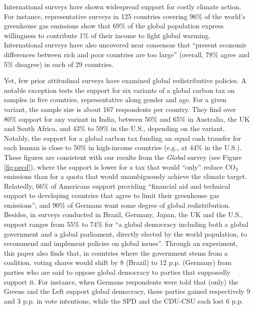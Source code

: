 International surveys have shown widespread support for costly climate action.\citep{dechezlepretre_fighting_2022,leiserowitz_international_2022} For instance, representative surveys in 125 countries covering 96\% of the world's greenhouse gas emissions show that 69\% of the global population express willingness to contribute 1\% of their income to fight global warming.\cite{andre_globally_2024} International surveys have also uncovered near consensus that ``present economic differences between rich and poor countries are too large'' (overall, 78\% agree and 5\% disagree) in each of 29 countries.\citep{issp_international_2019} 

Yet, few prior attitudinal surveys have examined global redistributive policies. 
A notable exception tests the support for six variants of a global carbon tax on samples in five countries, representative along gender and age.\cite{carattini_how_2019} For a given variant, the sample size is about 167 respondents per country. They find over 80\% support for any variant in India, between 50\% and 65\% in Australia, the UK and South Africa, and 43\% to 59\% in the U.S., depending on the variant. Notably, the support for a global carbon tax funding an equal cash transfer for each human is close to 50\% in high-income countries (e.g., at 44\% in the U.S.). These figures are consistent with our results from the \textit{Global} survey (see Figure \ref{fig:oecd}), where the support is lower for a tax that would ``only'' reduce CO$_\text{2}$ emissions than for a quota that would unambiguously achieve the climate target. 
Relatedly, 66\% of Americans support providing ``financial aid and technical support to developing countries that agree to limit their greenhouse gas emissions'';\cite{leiserowitz_public_2021} and 90\% of Germans want some degree of global redistribution.\cite{fehr_your_2022} 
Besides, in surveys conducted in Brazil, Germany, Japan, the UK and the U.S., support ranges from 55\% to 74\% for ``a global democracy including both a global government and a global parliament, directly elected by the world population, to recommend and implement policies on global issues''.\cite{ghassim_who_2020} %
Through an experiment, this paper also finds that, in countries where the government stems from a coalition, voting shares would shift by 8 (Brazil) to 12 p.p. (Germany) from parties who are said to oppose global democracy to parties that supposedly support it. For instance, when Germans respondents were told that (only) the Greens and the Left support global democracy, these parties gained respectively 9 and 3 p.p. in vote intentions, while the SPD and the CDU-CSU each lost 6 p.p. 

